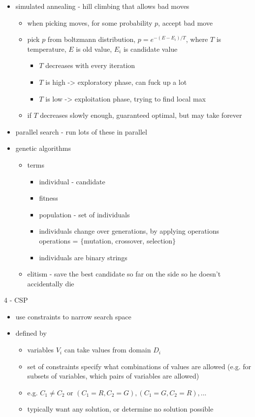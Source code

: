 \documentclass[11pt]{article}
\newcommand{\ee}[1]{\ensuremath{#1}}
\begin{document}
\begin{description}
\begin{itemize}
	\item simulated annealing - hill climbing that allows bad moves
	\begin{itemize}
		\item when picking moves, for some probability \ee{p}, accept bad move
		\item pick \ee{p} from boltzmann distribution, \ee{p = e^{-(E-E_i)/T}}, where \ee{T} is temperature, \ee{E} is old value, \ee{E_i} is candidate value
		\begin{itemize}
			\item \ee{T} decreases with every iteration
			\item \ee{T} is high -> exploratory phase, can fuck up a lot
			\item \ee{T} is low -> exploitation phase, trying to find local max
		\end{itemize}
		\item if \ee{T} decreases slowly enough, guaranteed optimal, but may take forever
	\end{itemize}

	\item parallel search - run lots of these in parallel
	
	\item genetic algorithms
	\begin{itemize}
		\item terms
		\begin{itemize}
			\item individual - candidate
			\item fitness
			\item population - set of individuals
			\item individuals change over generations, by applying operations
			\subitem operations = \ee{\{}mutation, crossover, selection\ee{\}}
			\item individuals are binary strings 
		\end{itemize}
		\item elitism - save the best candidate so far on the side so he doesn't accidentally die
	\end{itemize}
	
\end{itemize}

\item 4 - CSP
\begin{itemize}
	\item use constraints to narrow search space
	\item defined by
	\begin{itemize}
		\item variables \ee{V_i} can take values from domain \ee{D_i}
		\item set of constraints specify what combinations of values are allowed (e.g. for subsets of variables, which pairs of variables are allowed)
		\item e.g. \ee{C_1 \neq C_2} or \ee{(C_1 = R, C_2 = G), (C_1 = G, C_2 = R), ...}
		\item typically want any solution, or determine no solution possible
	\end{itemize}
	

\end{itemize}
\end{description}
\end{document}
